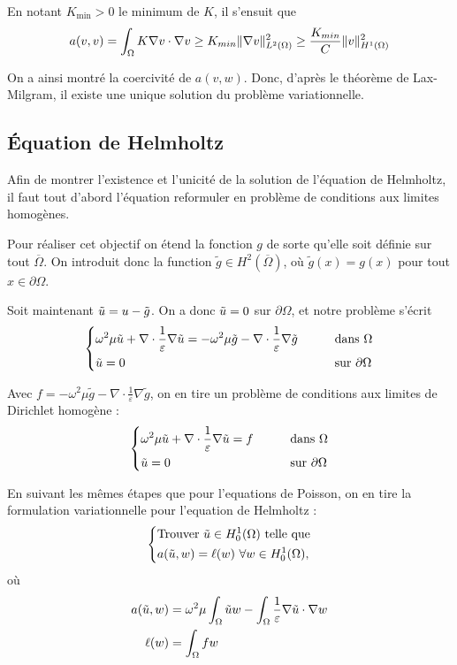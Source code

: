 En notant $K_{\min} > 0$ le minimum de $K$, il s'ensuit que
\begin{align}
    a(v, v) = \int_\Omega K \nabla v \cdot \nabla v
    \ge K_{min} \| \nabla v \|^2_{L^2(\Omega)}
    \ge \frac{K_{min}}{C} \| v \|^2_{H^1(\Omega)}
\end{align}

On a ainsi montré la coercivité de $a(v, w)$. Donc, d'après le théorème
de Lax-Milgram, il existe une unique solution du problème variationnelle.


\subsection{Équation de Helmholtz}

Afin de montrer l'existence et l'unicité de la solution de l'équation de
Helmholtz, il faut tout d'abord l'équation reformuler en problème de
conditions aux limites homogènes.

Pour réaliser cet objectif on étend la fonction $g$ de sorte qu'elle soit
définie sur tout $\overline \Omega$. On introduit donc la function
$\tilde{g} \in H^2(\overline \Omega)$, où $\tilde{g}(x) = g(x)$
pour tout $x \in \partial \Omega$.

Soit maintenant $\tilde{u} = u - \tilde{g}$. On a donc
$\tilde{u} = 0$ sur $\partial \Omega$, et notre problème s'écrit
\[\begin{dcases}
      \omega^2 \mu \tilde{u} + \nabla \cdot \frac{1}{\varepsilon} \nabla \tilde{u} =
      -\omega^2 \mu \tilde{g} - \nabla \cdot \frac{1}{\varepsilon} \nabla \tilde{g} \qquad
      & \text{dans } \Omega \\
      \tilde{u} = 0 & \text{sur } \partial \Omega
\end{dcases}\]

Avec $f = -\omega^2 \mu \tilde{g} - \nabla \cdot \frac{1}{\varepsilon} \nabla \tilde{g}$,
on en tire un problème de conditions aux limites de Dirichlet homogène :
\[\begin{dcases}
      \omega^2 \mu \tilde{u} + \nabla \cdot \frac{1}{\varepsilon} \nabla \tilde{u} = f
      \qquad & \text{dans } \Omega \\
      \tilde{u} = 0 & \text{sur } \partial \Omega
\end{dcases}\]

En suivant les mêmes étapes que pour l'equations de Poisson,
on en tire la formulation variationnelle pour l'equation de Helmholtz :
\[\begin{dcases}
    \text{Trouver } \ut \in H_0^1(\Omega) \text{ telle que} \\
    a(\ut, w) = \ell(w) \forall w \in H_0^1(\Omega),
\end{dcases}\]
%
où
\begin{align}
    a(\tilde{u}, w) &= \omega^2 \mu \int_\Omega \tilde{u} w
    -\int_\Omega \frac{1}{\varepsilon} \nabla \tilde{u} \cdot \nabla w \\
    \ell(w) &= \int_\Omega fw
\end{align}

